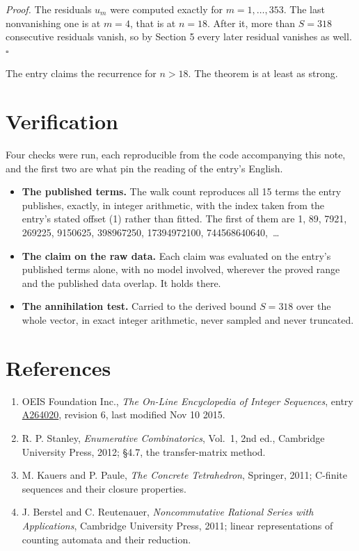 \documentclass[11pt]{article}
\theoremstyle{definition}
\begin{document}
{\itshape Proof.} The residuals $u_m$ were computed exactly for $m = 1,\dots,353$. The last nonvanishing one is at $m = 4$, that is at $n = 18$. After it, more than $S = 318$ consecutive residuals vanish, so by Section 5 every later residual vanishes as well. $\square$

The entry claims the recurrence for $n > 18$. The theorem is at least as strong.

\section{Verification}

Four checks were run, each reproducible from the code accompanying this note, and the first two are what pin the reading of the entry's English.

\begin{itemize}

\item {\bfseries The published terms.} The walk count reproduces all 15 terms the entry publishes, exactly, in integer arithmetic, with the index taken from the entry's stated offset (1) rather than fitted. The first of them are 1, 89, 7921, 269225, 9150625, 398967250, 17394972100, 744568640640,~\dots

\item {\bfseries The claim on the raw data.} Each claim was evaluated on the entry's published terms alone, with no model involved, wherever the proved range and the published data overlap. It holds there.

\item {\bfseries The annihilation test.} Carried to the derived bound $S = 318$ over the whole vector, in exact integer arithmetic, never sampled and never truncated.

\end{itemize}

\section{References}

\begin{enumerate}

\item OEIS Foundation Inc., \emph{The On-Line Encyclopedia of Integer Sequences}, entry \href{https://oeis.org/A264020}{A264020}, revision 6, last modified Nov 10 2015.

\item R. P. Stanley, \emph{Enumerative Combinatorics}, Vol.~1, 2nd ed., Cambridge University Press, 2012; \S4.7, the transfer-matrix method.

\item M. Kauers and P. Paule, \emph{The Concrete Tetrahedron}, Springer, 2011; C-finite sequences and their closure properties.

\item J. Berstel and C. Reutenauer, \emph{Noncommutative Rational Series with Applications}, Cambridge University Press, 2011; linear representations of counting automata and their reduction.

\end{enumerate}
\end{document}
